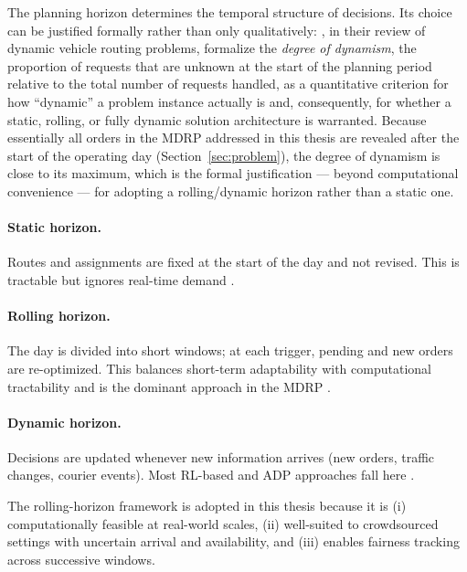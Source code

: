 \documentclass[12pt,a4paper]{report}
\begin{document}
The planning horizon determines the temporal structure of decisions. Its choice can be justified formally rather than only qualitatively: \citet{pillac2013review}, in their review of dynamic vehicle routing problems, formalize the \emph{degree of dynamism}, the proportion of requests that are unknown at the start of the planning period relative to the total number of requests handled, as a quantitative criterion for how ``dynamic'' a problem instance actually is and, consequently, for whether a static, rolling, or fully dynamic solution architecture is warranted. Because essentially all orders in the MDRP addressed in this thesis are revealed after the start of the operating day (Section~\ref{sec:problem}), the degree of dynamism is close to its maximum, which is the formal justification --- beyond computational convenience --- for adopting a rolling/dynamic horizon rather than a static one.

\paragraph{Static horizon.} Routes and assignments are fixed at the start of the day and not revised. This is tractable but ignores real-time demand
\citep{jozefowiez2009evolutionary,banos2013hybrid,yildiz2019provably,arora2023ocd,
dusadeerungsikul2023multi,thipparthy2024optimizing}.

\paragraph{Rolling horizon.} The day is divided into short windows; at each trigger, pending and new orders are re-optimized. This balances short-term adaptability with computational tractability and is the dominant approach in the MDRP \citep{reyes2018meal,wen2010dynamic,martinez2024exploring}.

\paragraph{Dynamic horizon.} Decisions are updated whenever new information arrives (new orders, traffic changes, courier events). Most RL-based and ADP approaches fall here \citep{ulmer2021restaurant,steever2019dynamic,bozanta2022courier,lesmana2019balancing,liao2020multi,ahamed2020deep,bi2023meal,simoni2023crowdsourced,xie2024genetic,
xue2021optimization,bajec2022strategic,bozanta2022courier,haferkamp2022heatmap,
neria2024restaurant}.

The rolling-horizon framework is adopted in this thesis because it is (i) computationally feasible at real-world scales, (ii) well-suited to crowdsourced settings with uncertain arrival and availability, and (iii) enables fairness tracking across successive windows.
\end{document}
